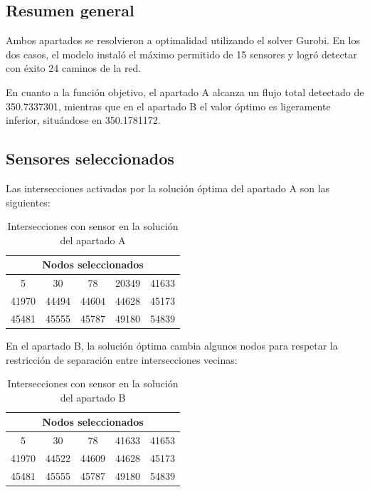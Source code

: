 \documentclass[12pt,a4paper]{article}
\begin{document}
\subsection{Resumen general}

Ambos apartados se resolvieron a optimalidad utilizando el solver Gurobi. En los dos casos, el modelo instaló el máximo permitido de 15 sensores y logró detectar con éxito 24 caminos de la red. 

En cuanto a la función objetivo, el apartado A alcanza un flujo total detectado de 350.7337301, mientras que en el apartado B el valor óptimo es ligeramente inferior, situándose en 350.1781172. 

\subsection{Sensores seleccionados}

Las intersecciones activadas por la solución óptima del apartado A son las siguientes:

\begin{table}[H]
\centering
\caption{Intersecciones con sensor en la solución del apartado A}
\begin{tabular}{ccccc}
\toprule
\multicolumn{5}{c}{\textbf{Nodos seleccionados}} \\
\midrule
5 & 30 & 78 & 20349 & 41633 \\
41970 & 44494 & 44604 & 44628 & 45173 \\
45481 & 45555 & 45787 & 49180 & 54839 \\
\bottomrule
\end{tabular}
\end{table}

En el apartado B, la solución óptima cambia algunos nodos para respetar la restricción de separación entre intersecciones vecinas:

\begin{table}[H]
\centering
\caption{Intersecciones con sensor en la solución del apartado B}
\begin{tabular}{ccccc}
\toprule
\multicolumn{5}{c}{\textbf{Nodos seleccionados}} \\
\midrule
5 & 30 & 78 & 41633 & 41653 \\
41970 & 44522 & 44609 & 44628 & 45173 \\
45481 & 45555 & 45787 & 49180 & 54839 \\
\bottomrule
\end{tabular}
\end{table}
\end{document}
